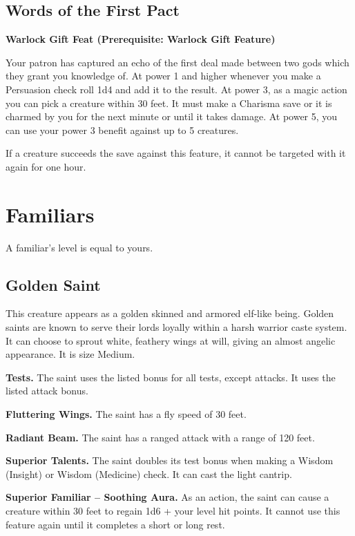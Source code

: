 \documentclass[12pt,letterpaper,twocolumn,openany,nodeprecatedcode,bg=none]{dndbook}
\begin{document}
\subsection{Words of the First Pact}\label{words-of-the-first-pact}

\textbf{Warlock Gift Feat (Prerequisite: Warlock Gift Feature)}

Your patron has captured an echo of the first deal made between two gods
which they grant you knowledge of. At power 1 and higher whenever you
make a Persuasion check roll 1d4 and add it to the result. At power 3,
as a magic action you can pick a creature within 30 feet. It must make a
Charisma save or it is charmed by you for the next minute or until it
takes damage. At power 5, you can use your power 3 benefit against up to
5 creatures.

If a creature succeeds the save against this feature, it cannot be
targeted with it again for one hour.

\onecolumn

\section{Familiars}\label{familiars}

A familiar's level is equal to yours.

\subsection{Golden Saint}\label{golden-saint}

This creature appears as a golden skinned and armored elf-like being.
Golden saints are known to serve their lords loyally within a harsh
warrior caste system. It can choose to sprout white, feathery wings at
will, giving an almost angelic appearance. It is size Medium.

\textbf{Tests.} The saint uses the listed bonus for all tests, except
attacks. It uses the listed attack bonus.

\textbf{Fluttering Wings.} The saint has a fly speed of 30 feet.

\textbf{Radiant Beam.} The saint has a ranged attack with a range of 120
feet.

\textbf{Superior Talents.} The saint doubles its test bonus when making
a Wisdom (Insight) or Wisdom (Medicine) check. It can cast the light
cantrip.

\textbf{Superior Familiar -- Soothing Aura.} As an action, the saint can
cause a creature within 30 feet to regain 1d6 + your level hit points.
It cannot use this feature again until it completes a short or long
rest.
\end{document}
